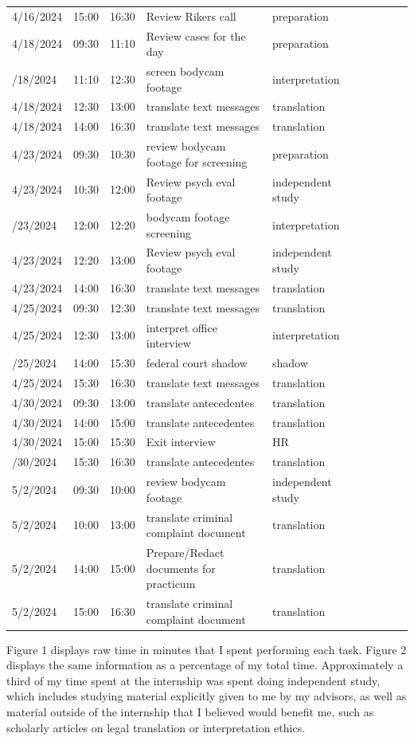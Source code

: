 \documentclass{article}
\begin{document}
\begin{longtable}{lp{1.8cm} l p{5cm} l p{1.5cm} l p{5cm} l p{5cm}}
4/16/2024 & 15:00 & 16:30 & Review Rikers call & preparation\\
4/18/2024 & 09:30 & 11:10 & Review cases for the day & preparation\\
\addlinespace
4/18/2024 & 11:10 & 12:30 & screen bodycam footage & interpretation\\
4/18/2024 & 12:30 & 13:00 & translate text messages & translation\\
4/18/2024 & 14:00 & 16:30 & translate text messages & translation\\
4/23/2024 & 09:30 & 10:30 & review bodycam footage for screening & preparation\\
4/23/2024 & 10:30 & 12:00 & Review psych eval footage & independent study\\
\addlinespace
4/23/2024 & 12:00 & 12:20 & bodycam footage screening & interpretation\\
4/23/2024 & 12:20 & 13:00 & Review psych eval footage & independent study\\
4/23/2024 & 14:00 & 16:30 & translate text messages & translation\\
4/25/2024 & 09:30 & 12:30 & translate text messages & translation\\
4/25/2024 & 12:30 & 13:00 & interpret office interview & interpretation\\
\addlinespace
4/25/2024 & 14:00 & 15:30 & federal court shadow & shadow\\
4/25/2024 & 15:30 & 16:30 & translate text messages & translation\\
4/30/2024 & 09:30 & 13:00 & translate antecedentes & translation\\
4/30/2024 & 14:00 & 15:00 & translate antecedentes & translation\\
4/30/2024 & 15:00 & 15:30 & Exit interview & HR\\
\addlinespace
4/30/2024 & 15:30 & 16:30 & translate antecedentes & translation\\
5/2/2024 & 09:30 & 10:00 & review bodycam footage & independent study\\
5/2/2024 & 10:00 & 13:00 & translate criminal complaint document & translation\\
5/2/2024 & 14:00 & 15:00 & Prepare/Redact documents for practicum & translation\\
5/2/2024 & 15:00 & 16:30 & translate criminal complaint document & translation\\
\bottomrule
\end{longtable}

Figure 1 displays raw time in minutes that I spent performing each task. Figure 2 displays the same information as a percentage of my total time. Approximately a third of my time spent at the internship was spent doing independent study, which includes studying material explicitly given to me by my advisors, as well as material outside of the internship that I believed would benefit me, such as scholarly articles on legal translation or interpretation ethics.
\end{document}
